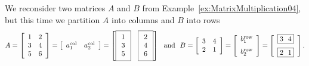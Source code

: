  We reconsider two matrices $A$ and $B$ from Example~\ref{ex:MatrixMultiplication04}, but this time we partition $A$ into columns and $B$ into rows
 $$A=\left[\begin{array}{cc} 1 & 2\\
3 & 4 \\ 5 & 6 \end{array}\right] = \left[\begin{array}{cc} a_1^{\rm col} & a_2^{\rm col} \end{array}\right]  = 
\left[ \boxed{\begin{array}{c} 1 \\ 3 \\ 5\end{array} }~~~
\boxed{\begin{array}{c} 2 \\ 4 \\ 6\end{array} }\right]
~~\text{and}~~B=\left[\begin{array}{ccc}
 3 &4  \\
2 & 1 \end{array}\right] = \left[\begin{array}{c} b_1^{\rm row} \medskip \\
b_2^{\rm row} \end{array}\right]  = \left[\begin{array}{c}\boxed{ 3 ~~ 4} \medskip\\
\boxed{ 2 ~~ 1}
\end{array} \right].$$

